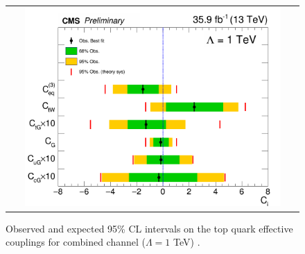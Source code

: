 \begin{figure}[h]
  \begin{center}
    \begin{tabular}{c}
      \includegraphics[width=0.9\textwidth]{figures/tW/fig/Result/tW_limit.png}\\
    \end{tabular}
    \caption{Observed and expected 95\% CL intervals on the top quark effective couplings for combined channel ($\Lambda=1$ TeV) \cite{CMS-AN-2017-134}.}
    \label{fin}
  \end{center}
\end{figure}





